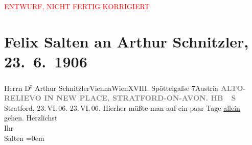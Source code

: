 
\begin{center}
            \textcolor{red}{ENTWURF, NICHT FERTIG KORRIGIERT}
                      \end{center}
            
         \renewcommand{\erwaehnteOrte}{Orte: Edmund-Weiß-Gasse, Stratford-upon-Avon, Wien, Österreich}
         \renewcommand{\erwaehnteWerke}{Werke: Shakespeare Monument}
               \section[Felix Salten an Arthur Schnitzler, 23. 6. 1906]{ Felix Salten an Arthur Schnitzler, 23. 6. 1906}\nopagebreak{}\rehead{ }\begin{ledgroupsized}[t]{13cm}\normalsize\beginnumbering \toendnotes[C]{\smallbreak\pagebreak[2]} 
\pstart{}{\pb}Herrn D\textsuperscript{r} Arthur Schnitzler\pend{}\pstart{}ViennaWien\pend{}\pstart{}XVIII. Spöttelgaſse 7\pend{}\pstart{}Austria\pend{}{\bigskip}\pstart
           \noindent{}\centering{}{\pb}\textcolor{gray}{\textbf{ALTO-RELIEVO IN NEW PLACE, STRATFORD-ON-AVON. HB {\kaufmannsund} S}}\pend
           \pstart
           \centering{}{\pb}Stratford, 23. VI. 06.
                     23. VI. 06.\pend
           \pstart
           Hierher müßte man auf ein paar Tage \uline{allein} gehen.\pend
           \pstart
           Herzlichst {\\[\baselineskip]}Ihr {\\[\baselineskip]}\spacefill\mbox{Salten}\pend
           \leftskip=0em{}
         
         \endnumbering{}\end{ledgroupsized}\begin{anhang}\end{anhang}\newcommand{\dateiname}{L03428}\newcommand{\titel}{Felix Salten an Arthur Schnitzler, 23. 6. 1906}\newcommand{\editorInnen}{Martin Anton Müller und Laura Untner}
      